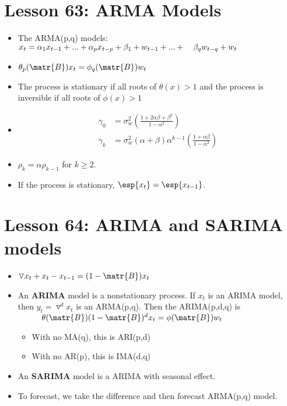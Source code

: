 \documentclass[10pt, french]{article}
\begin{document}
\begin{multicols*}{3}
\section*{Lesson 63: ARMA Models}
\begin{itemize}[align=left,leftmargin=*]
   \item The ARMA(p,q) models:\\
   $x_t = \alpha_1 x_{t-1} + ... + \alpha_p x_{t-p} + \beta_1 + w_{t-1} + ... + \hspace*{0.35cm} \beta_q w_{t-q} + w_t$
   \item[] $\theta_p(\matr{B})x_t = \phi_q(\matr{B})w_t$
   \item The process is stationary if all roots of $\theta(x)>1$ and the process is inversible if all roots of $\phi(x)>1$
   \item[]
    \begin{align*}
      \gamma_0 &= \sigma_w^2 \left(\frac{1 + 2\alpha\beta + \beta^2}{1 - \alpha^2} \right)  \\
      \gamma_k &= \sigma_w^2 (\alpha + \beta) \alpha^{k-1}\left(\frac{1+\alpha\beta}{1 - \alpha^2}\right)
    \end{align*}
    \item[] $\rho_k = \alpha\rho_{k-1}$ for $k\geq2$.
    \item If the process is stationary, $\esp{x_t} = \esp{x_{t-1}}$.
\end{itemize}

\section*{Lesson 64: ARIMA and SARIMA models}
\begin{itemize}[align=left,leftmargin=*]
    \item $\triangledown x_t + x_t - x_{t-1} = (1 - \matr{B})x_t$
   \item An \textbf{ARIMA} model is a nonstationary process. If $x_t$ is an ARIMA model, then $y_t = \triangledown^d x_t$ is an ARMA(p,q). Then the ARIMA(p,d,q) is \\
   $\hspace*{1cm} \theta(\matr{B})(1-\matr{B})^d x_t = \phi(\matr{B})w_t$
   \begin{itemize}
     \item With no MA(q), this is ARI(p,d)
     \item With no AR(p), this is IMA(d,q)
   \end{itemize}
   \item An \textbf{SARIMA} model is a ARIMA with seasonal effect.
   \item To forecast, we take the difference and then forecast ARMA(p,q) model.
\end{itemize}





\end{multicols*}
\end{document}
